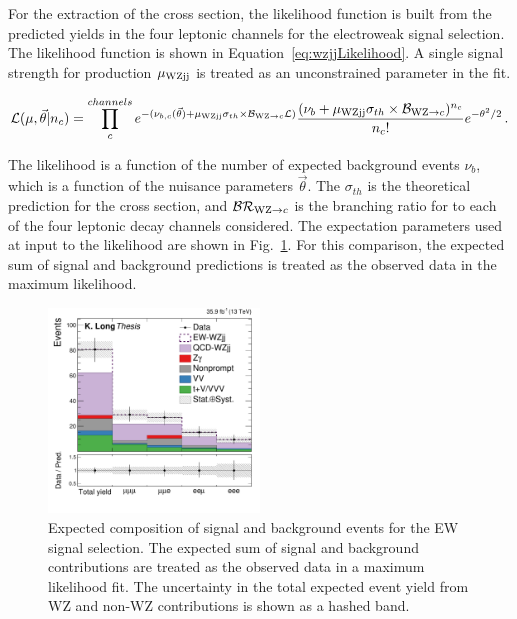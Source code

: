 For the extraction of the \WZjj cross section, the likelihood function is built
from the predicted yields in the four leptonic channels for the electroweak signal selection. 
The likelihood function is shown in Equation~\ref{eq:wzjjLikelihood}.
A single signal strength for \WZjj production $\mu_{\rm {WZjj}}$ is treated as an unconstrained parameter in the fit.

\begin{equation}
  \mathcal{L}(\mu, \vec{\theta} | n_{c}) = 
    \prod_{c}^{channels} e^{-(\nu_{b, c}(\vec{\theta}) + 
    \mu_{\rm {WZjj}}\sigma_{th}\times\mathcal{B}_{\mathrm{W}\mathrm{Z} \rightarrow c} \mathcal{L})}
    \frac{(\nu_{b} + \mu_{\rm {WZjj}}\sigma_{th} 
    \times\mathcal{B}_{\mathrm{W}\mathrm{Z} \rightarrow c})^{n_{c}}}{n_{c}!} 
    e^{-\theta^2/2} \,.
    \label{eq:wzjjLikelihood}
\end{equation}

The likelihood is a function of the number of expected background events $\nu_{b}$, which is
a function of the nuisance parameters $\vec{\theta}$. The 
$\sigma_{th}$ is the theoretical prediction for the \WZjj cross section, and 
$\mathcal{BR}_{\mathrm{W}\mathrm{Z} \rightarrow c}$ is the branching ratio for \WZ to each of the four leptonic decay
channels considered. The expectation parameters used at input to the likelihood are shown
in Fig.~\ref{fig:expectedEWSignal}. For this comparison, the expected sum of signal and background
predictions is treated as the observed data in the maximum likelihood.

\begin{figure}[htbp]
  \centering
   \includegraphics[width=0.5\textwidth]{figures/AnalysisProcedure/expectedYield_EWSignal.pdf}
  \caption{
    Expected composition of signal and background events for the EW signal selection.
    The expected sum of signal and background contributions are treated as the observed
    data in a maximum likelihood fit. The uncertainty in the total expected event yield
    from WZ and non-WZ contributions is shown as a hashed band.
        }
 \label{fig:expectedEWSignal}
\end{figure}

